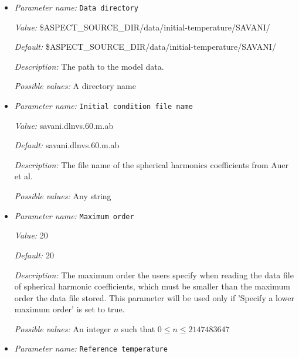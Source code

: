 \begin{itemize}
\item {\it Parameter name:} {\tt Data directory}
\label{parameters:Initial temperature model/SAVANI perturbation/Data directory}
\label{parameters:Initial_20temperature_20model/SAVANI_20perturbation/Data_20directory}


{\it Value:} \$ASPECT\_SOURCE\_DIR/data/initial-temperature/SAVANI/


{\it Default:} \$ASPECT\_SOURCE\_DIR/data/initial-temperature/SAVANI/


{\it Description:} The path to the model data.


{\it Possible values:} A directory name
\item {\it Parameter name:} {\tt Initial condition file name}
\label{parameters:Initial temperature model/SAVANI perturbation/Initial condition file name}
\label{parameters:Initial_20temperature_20model/SAVANI_20perturbation/Initial_20condition_20file_20name}


{\it Value:} savani.dlnvs.60.m.ab


{\it Default:} savani.dlnvs.60.m.ab


{\it Description:} The file name of the spherical harmonics coefficients from Auer et al.


{\it Possible values:} Any string
\item {\it Parameter name:} {\tt Maximum order}
\label{parameters:Initial temperature model/SAVANI perturbation/Maximum order}
\label{parameters:Initial_20temperature_20model/SAVANI_20perturbation/Maximum_20order}


{\it Value:} 20


{\it Default:} 20


{\it Description:} The maximum order the users specify when reading the data file of spherical harmonic coefficients, which must be smaller than the maximum order the data file stored. This parameter will be used only if 'Specify a lower maximum order' is set to true.


{\it Possible values:} An integer $n$ such that $0\leq n \leq 2147483647$
\item {\it Parameter name:} {\tt Reference temperature}
\label{parameters:Initial temperature model/SAVANI perturbation/Reference temperature}
\label{parameters:Initial_20temperature_20model/SAVANI_20perturbation/Reference_20temperature}



\end{itemize}
